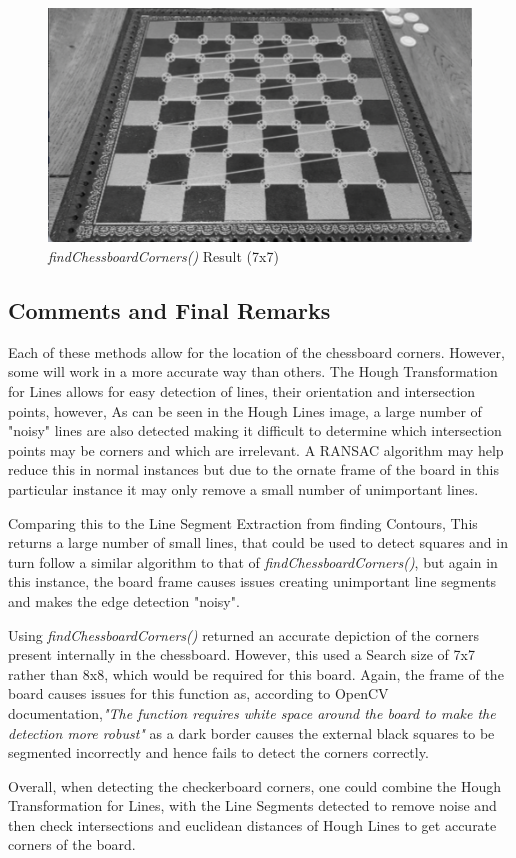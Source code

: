 \documentclass[11pt]{article}
\begin{document}
    \begin{figure}
        \centering
        \includegraphics[scale=0.4]{findChessboardCorners.png}
        \caption{\emph{findChessboardCorners()} Result (7x7)}
    \end{figure}

    \subsection{Comments and Final Remarks}
    \par
    Each of these methods allow for the location of the chessboard corners. However, some will work in a more accurate way than others. The Hough Transformation for Lines allows for easy detection of lines, their orientation and intersection points, however, As can be seen in the Hough Lines image, a large number of "noisy" lines 
    are also detected making it difficult to determine which intersection points may be corners and which are irrelevant. A RANSAC algorithm may help reduce this in normal instances but due to the ornate frame of the board in this particular instance it may only remove a small number of unimportant lines. 
    \par
    Comparing this to the Line Segment Extraction from finding Contours, This returns a large number of small lines, that could be used to detect squares and in turn follow a similar algorithm to that of \emph{findChessboardCorners()}, but again in this instance, the board frame causes issues creating unimportant line segments and makes
    the edge detection "noisy". 
    \par
    Using \emph{findChessboardCorners()} returned an accurate depiction of the corners present internally in the chessboard. However, this used a Search size of 7x7 rather than 8x8, which would be required for this board. Again, the frame of the board causes issues for this function as, according to OpenCV documentation,\emph{"The function requires white space
    around the board to make the detection more robust"} as a dark border causes the external black squares to be segmented incorrectly and hence fails to detect the corners correctly.
    \par
    Overall, when detecting the checkerboard corners, one could combine the Hough Transformation for Lines, with the Line Segments detected to remove noise and then check intersections and euclidean distances of Hough Lines to get accurate 
    corners of the board.
\end{document}
